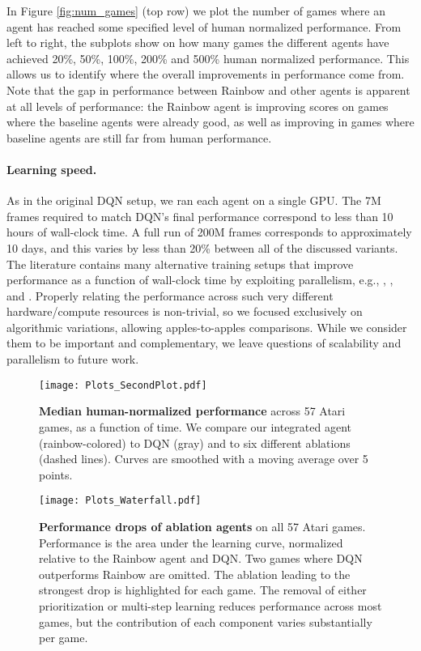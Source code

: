 \documentclass[letterpaper]{article} %
\begin{document}
In Figure \ref{fig:num_games} (top row) we plot the number of games where an agent has reached some specified level of human normalized performance. From left to right, the subplots show on how many games the different agents have achieved 20\%, 50\%, 100\%, 200\% and 500\% human normalized performance. This allows us to identify where the overall improvements in performance come from. Note that the gap in performance between Rainbow and other agents is apparent at all levels of performance: the Rainbow agent is improving scores on games where the baseline agents were already good, as well as improving in games where baseline agents are still far from human performance.

\paragraph{Learning speed.}
As in the original DQN setup, we ran each agent on a single GPU. The 7M frames required to match DQN's final performance correspond to less than 10 hours of wall-clock time. A full run of 200M frames corresponds to approximately 10 days, and this varies by less than 20\% between all of the discussed variants. The literature contains many alternative training setups that improve performance as a function of wall-clock time by exploiting parallelism, e.g., \citeauthor{Nair2015} , \citeauthor{nes_atari} , and \citeauthor{Mnih:2016} . Properly relating the performance across such very different hardware/compute resources is non-trivial, so we focused exclusively on algorithmic variations, allowing apples-to-apples comparisons. While we consider them to be important and complementary, we leave questions of scalability and parallelism to future work.

\begin{figure}[t]
\centering
\vspace*{-.7cm}
\texttt{[image: Plots\_SecondPlot.pdf]}
\vspace*{-0.7cm}
\caption{\textbf{Median human-normalized performance} across 57 Atari games, as a function of time. We compare our integrated agent (rainbow-colored) to DQN (gray) and to  six different ablations (dashed lines). Curves are smoothed with a moving average over 5 points.}
\label{fig:ks_vs_ablations}
\end{figure}


\begin{figure*}[t]
\centering
\texttt{[image: Plots\_Waterfall.pdf]}
\caption{\textbf{Performance drops of ablation agents} on all 57 Atari games. Performance is the area under the learning curve, normalized relative to the Rainbow agent and DQN. Two games where DQN outperforms Rainbow are omitted. The ablation leading to the strongest drop is highlighted for each game.
The removal of either prioritization or multi-step learning reduces performance across most games, but the contribution of each component varies substantially per game.}
\label{fig:rainbow_waterfall}
\end{figure*}
\end{document}
